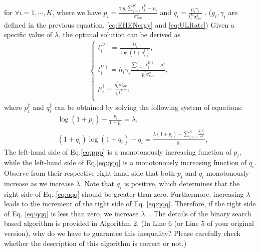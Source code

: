 \documentclass[12pt,draftcls,onecolumn,journal]{IEEEtran}
\begin{document}
for $\forall i = 1,\cdots,K$, where we have  \cbstart $p_i = \frac{\gamma_ig_i\sum_{j=1}^{K}t_j^D-\mu_i}{\sigma_{cov}^2}$ and $q_i = \frac{\mu_i\gamma_i}{t_i^{D}\sigma_{cov}^2}$ \cbend. {\color{red} ($g_i, \gamma_i$ are defined in the previous equation, \eqref{eq:EHENergy} and \eqref{eq:ULRate})} Given a specific value of $\lambda$, the optimal solution can be derived as
\begin{align}
	\left\{
	\begin{array}{l}
		t_i^{D\ddagger}=\frac{D_i}{\log(1+q_i^\ddagger)}, \\
		t_i^{U\ddagger}=h_i\gamma_i\frac{\sum_{j=1}^K{t_j^{D\ddagger}}-\mu_i^\ddagger}{p_i^\ddagger\sigma_{cov}^2},\\
        \mu_i^\ddagger=\frac{q_i^\ddagger\sigma_{cov}^2}{\gamma_i t_i^{D\ddagger}}, \\
	\end{array}
	\right. \label{eq:Sum-Opt}
\end{align}
where $p_{i}^{\ddagger}$ and $q_{i}^{\ddagger}$ can be obtained by solving the following system of equations:
\begin{align}
	&\log(1+p_i)-\frac{p_i}{1+p_i}=\lambda, \label{eq:ppp} \\
	&(1+q_i)\log(1+q_i) - q_i=\frac{\lambda(1+p_i) - \sum_{j=1}^{K}\frac{g_j\gamma_j}{\sigma^2}}{g_i}, \label{eq:qqq}
\end{align}
The left-hand side of Eq.\eqref{eq:ppp} is a monotonously increasing function of $p_i$, while the left-hand side of Eq.\eqref{eq:qqq} is a monotonously increasing function of $q_i$. Observe from their respective right-hand side that both $p_i$ and $q_i$ monotonously increase as we increase $\lambda$. \cbstart Note that $q_i$ is positive, which determines that the right side of Eq. \eqref{eq:qqq} should be greater than zero. Furthermore, increasing $\lambda$ leads to the increment of the right side of Eq. \eqref{eq:qqq}. Therefore, if the right side of Eq. \eqref{eq:qqq} is less than zero, we increase $\lambda$. . The details of the binary search based algorithm is provided in Algorithm 2. {\color{red} (In Line 6 (or Line 5 of your original version), why do we have to guarantee this inequality? Please carefully check whether the description of this algorithm is correct or not.)} 
\end{document}
